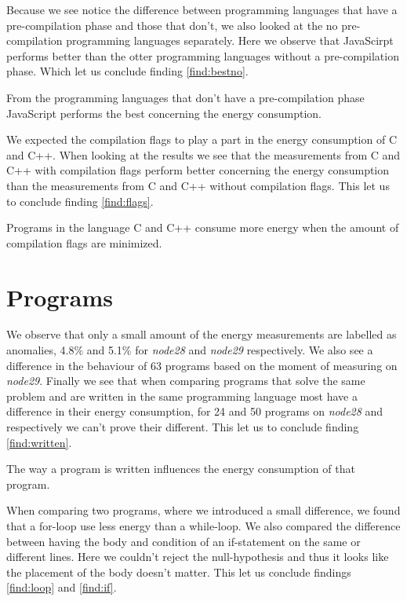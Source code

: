 Because we see notice the difference between programming languages that have a pre-compilation phase and those that don't, we also looked at the no pre-compilation programming languages separately. Here we observe that JavaScirpt performs better than the otter programming languages without a pre-compilation phase. Which let us conclude finding \ref{find:bestno}.\\

\begin{finding}
	From the programming languages that don't have a pre-compilation phase JavaScript performs the best concerning the energy consumption.
	\label{find:bestno}
\end{finding}

We expected the compilation flags to play a part in the energy consumption of C and C++. When looking at the results we see that the measurements from C and C++ with compilation flags perform better concerning the energy consumption than the measurements from C and C++ without compilation flags. This let us to conclude finding \ref{find:flags}.\\

\begin{finding}
	Programs in the language C and C++ consume more energy when the amount of compilation flags are minimized.
	\label{find:flags}
\end{finding}

\section{Programs}
We observe that only a small amount of the energy measurements are labelled as anomalies, 4.8\% and 5.1\% for \textit{node28} and \textit{node29} respectively. We also see a difference in the behaviour of 63 programs based on the moment of measuring on \textit{node29}. Finally we see that when comparing programs that solve the same problem and are written in the same programming language most have a difference in their energy consumption, for 24 and 50 programs on \textit{node28} and  respectively we can't prove their different. This let us to conclude finding \ref{find:written}.\\

\begin{finding}
	The way a program is written influences the energy consumption of that program.
	\label{find:written}
\end{finding}

When comparing two programs, where we introduced a small difference, we found that a for-loop use less energy than a while-loop. We also compared the difference between having the body and condition of an if-statement on the same or different lines. Here we couldn't reject the null-hypothesis and thus it looks like the placement of the body doesn't matter. This let us conclude findings \ref{find:loop} and \ref{find:if}. 

